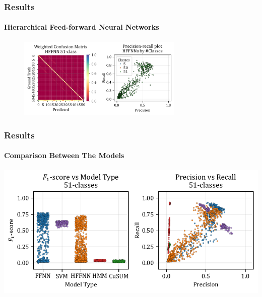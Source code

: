 \documentclass[xcolor={svgnames,table},10pt,fleqn]{beamer}
\begin{document}
\begin{frame}
    \frametitle{Results}
    \framesubtitle{Hierarchical Feed-forward Neural Networks}
    \begin{figure}[h]
        \centering
        \includegraphics[width=0.7\textwidth]{05_mean_conf_mat_hffnn.pdf}
    \end{figure}
\end{frame}

\begin{frame}
    \frametitle{Results}
    \framesubtitle{Comparison Between The Models}
    \includegraphics[width=\textwidth]{05_precision_recall_51_classes.pdf}
\end{frame}
\end{document}
